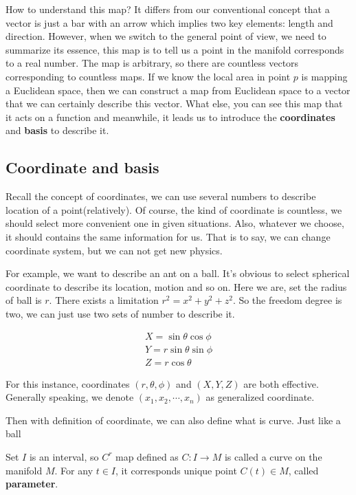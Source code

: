 How to understand this map? It differs from our conventional concept that a vector is just a bar with an arrow which implies two key elements: length and direction. However, when we switch to the general point of view, we need to summarize its essence, this map is to tell us a point in the manifold corresponds to a real number. The map is arbitrary, so there are countless vectors corresponding to countless maps. If we know the local area in point $p$ is mapping a Euclidean space, then we can construct a map from Euclidean space to a vector that we can certainly describe this vector. What else, you can see this map that it acts on a function and meanwhile, it leads us to introduce the \textbf{coordinates} and \textbf{basis} to describe it.

\subsection{Coordinate and basis}

Recall the concept of coordinates, we can use several numbers to describe location of a point(relatively). Of course, the kind of coordinate is countless, we should select more convenient one in given situations. Also, whatever we choose, it should contains the same information for us. That is to say, we can change coordinate system, but we can not get new physics.

For example, we want to describe an ant on a ball. It's obvious to select spherical coordinate to describe its location, motion and so on. Here we are, set the radius of ball is $r$. There exists a limitation $r^{2}=x^{2}+y^{2}+z^{2}$. So the freedom degree is two, we can just use two sets of number to describe it.

\begin{align}
    X=\sin \theta\cos \phi\\
    Y=r\sin \theta\sin \phi\\
    Z=r\cos\theta
\end{align}

For this instance, coordinates $(r,\theta,\phi)$ and $(X,Y,Z)$ are both effective. Generally speaking, we denote $(x_{1},x_{2},\cdots,x_{n})$ as generalized coordinate. 

Then with definition of coordinate, we can also define what is curve. Just like a ball

\begin{tcolorbox}[title=\textbf{Curve},colback=SeaGreen!10!CornflowerBlue!10,colframe=RoyalPurple!55!Aquamarine!100!]
    Set $I$ is an interval, so $C^{r}$ map defined as $C:I\rightarrow M$ is called a curve on the manifold $M$. For any $t\in I$, it corresponds unique point $C(t)\in M$, called \textbf{parameter}.
\end{tcolorbox}

